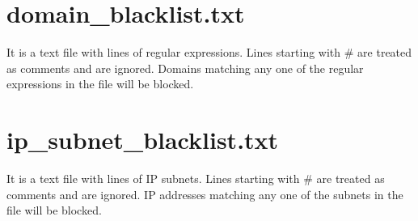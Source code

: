 \documentclass[mscthesis]{usiinfthesis}
\begin{document}
\section{domain\_blacklist.txt}\label{sec:domain_blacklist.txt}
It is a text file with lines of regular expressions. Lines starting with \# are treated as comments and are ignored. Domains matching any one of the regular expressions in the file will be blocked.

\section{ip\_subnet\_blacklist.txt}\label{sec:ip_subnet_blacklist.txt}
It is a text file with lines of IP subnets. Lines starting with \# are treated as comments and are ignored. IP addresses matching any one of the subnets in the file will be blocked.
\end{document}
